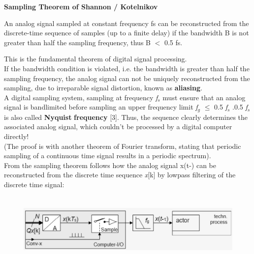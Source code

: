 {\rot\bf Sampling Theorem of Shannon / Kotelnikov}

\begin{tcolorbox}[colback=blue!5!white,colframe=blue!75!black]
An analog signal sampled at constant frequency fs can be reconstructed from the discrete-time sequence of samples (up to a finite delay) if the bandwidth B is not greater than half the sampling frequency, thus B $<$ 0.5 fs.
\end{tcolorbox}

This is the fundamental theorem of digital signal processing.\\

If the bandwidth condition is violated, i.e. the bandwidth is greater than half the sampling frequency, the analog signal can not be uniquely reconstructed from the sampling, due to irreparable signal distortion, known as \textbf{aliasing}.\\

A digital sampling system, sampling at frequency \textit{f${}_{s}$} must ensure that an analog signal is bandlimited before sampling an upper frequency limit \textit{f${}_{g}$} $\mathrm{\le}$ 0.5\textit{ f${}_{s}$} .0.5\textit{ f${}_{s}$} is also called \textbf{Nyquist} \textbf{frequency} [3]. Thus, the sequence clearly determines the associated analog signal, which couldn't be processed by a digital computer directly!\\

(The proof is with another theorem of Fourier transform, stating that periodic sampling of a continuous time signal results in a periodic spectrum).\\

From the sampling theorem follows how the analog signal x(t-) can be reconstructed from the discrete time sequence \textit{x}[k]  by lowpass filtering of the discrete time signal:\\

    \begin{figure}[h]
    \centering
    \includegraphics[width=14cm, height=3.5cm]{Images/image138.png}
    \label{fig:Fig }
    \end{figure}

